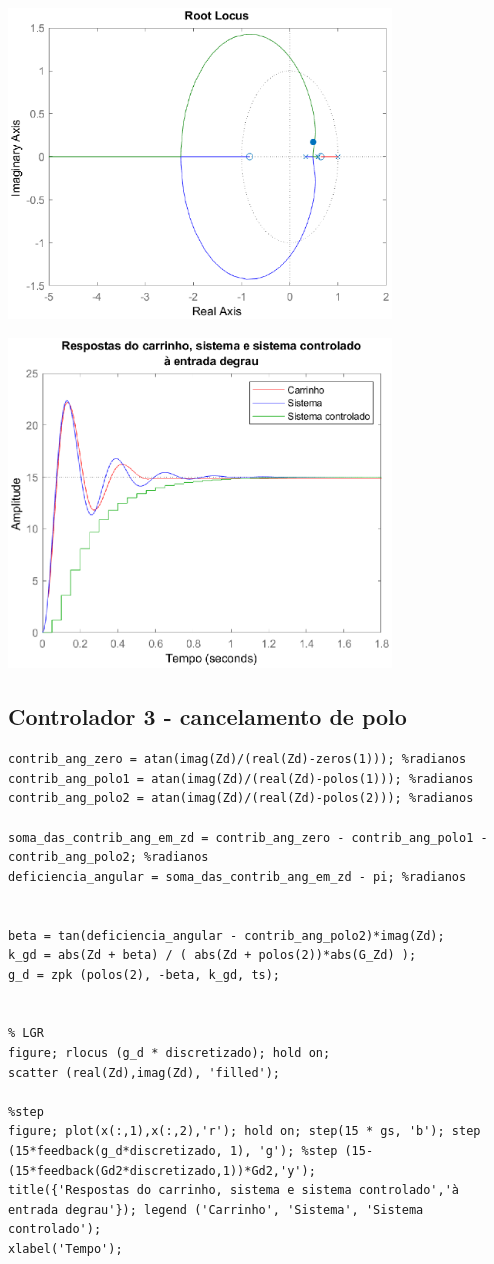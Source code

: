 \documentclass{article}
\begin{document}
\includegraphics [width=4in]{images/Matlab/identifica_05.eps}

\includegraphics [width=4in]{images/Matlab/identifica_06.eps}


\subsection*{Controlador 3 - cancelamento de polo}

\begin{lstlisting}
contrib_ang_zero = atan(imag(Zd)/(real(Zd)-zeros(1))); %radianos
contrib_ang_polo1 = atan(imag(Zd)/(real(Zd)-polos(1))); %radianos
contrib_ang_polo2 = atan(imag(Zd)/(real(Zd)-polos(2))); %radianos

soma_das_contrib_ang_em_zd = contrib_ang_zero - contrib_ang_polo1 - contrib_ang_polo2; %radianos
deficiencia_angular = soma_das_contrib_ang_em_zd - pi; %radianos


beta = tan(deficiencia_angular - contrib_ang_polo2)*imag(Zd);
k_gd = abs(Zd + beta) / ( abs(Zd + polos(2))*abs(G_Zd) );
g_d = zpk (polos(2), -beta, k_gd, ts);


% LGR
figure; rlocus (g_d * discretizado); hold on;
scatter (real(Zd),imag(Zd), 'filled');

%step
figure; plot(x(:,1),x(:,2),'r'); hold on; step(15 * gs, 'b'); step (15*feedback(g_d*discretizado, 1), 'g'); %step (15-(15*feedback(Gd2*discretizado,1))*Gd2,'y');
title({'Respostas do carrinho, sistema e sistema controlado','à entrada degrau'}); legend ('Carrinho', 'Sistema', 'Sistema controlado');
xlabel('Tempo');
\end{lstlisting}
\end{document}
